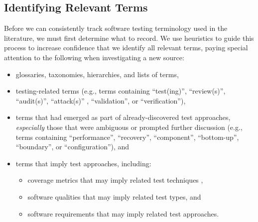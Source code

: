 \subsection{Identifying Relevant Terms}\label{ident-terms}
Before we can consistently track software testing terminology used in the
literature, we must first determine what to record. We use heuristics to guide
this process to increase confidence that we identify all relevant terms, paying
special attention to the following when investigating a new source:
\begin{itemize}
    \item glossaries, taxonomies, hierarchies, and lists of terms,
    \item testing-related terms (e.g., terms containing ``test(ing)'',
          \ifnotpaper ``review(s)'', ``audit(s)'', ``attack(s)''%
              , \fi ``validation'', or ``verification''),
    \item terms that had emerged as part of already-discovered
          test approaches, \emph{especially} those that were ambiguous
          or prompted further discussion (e.g., terms containing
          ``performance'', ``recovery'', ``component'', ``bottom-up'',
          \ifnotpaper ``boundary'', \fi or ``configuration''), and
    \item {}\label{implied-approaches}
          terms that imply test approaches, including:
          \newcommand\derivTest[2]{#1 that may imply \ifnotpaper related \fi test #2}
          \begin{itemize}
              \item \derivTest{coverage metrics}{techniques}%
                    ,
              \item {}\label{qual-types}
                    \derivTest{software qualities}{types}, and
              \item {}\label{req-apps}
                    \derivTest{\ifnotpaper software \fi requirements}{approaches}.
          \end{itemize}
\end{itemize}


